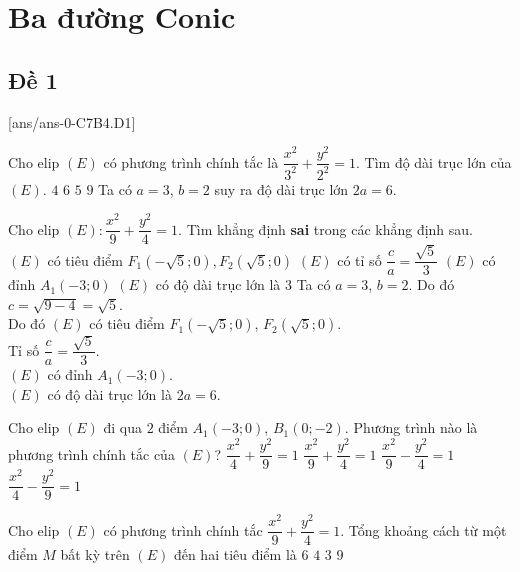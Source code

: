 \section{Ba đường Conic}

\subsection{Đề 1}
[ans/ans-0-C7B4.D1]
\caulc
\begin{ex}%
	Cho elip $(E)$ có phương trình chính tắc là $\dfrac{x^2}{3^2}+\dfrac{y^2}{2^2}=1$. Tìm độ dài trục lớn của $(E)$.
	\choice
	{$ 4 $}
	{\True $ 6 $}
	{$ 5 $}
	{$ 9 $}	
	\loigiai
	{
		Ta có $ a=3 $, $ b=2 $ suy ra độ dài trục lớn $ 2a=6 $.
	}
\end{ex}

\begin{ex}%
	Cho elip $(E)\colon  \dfrac{x^2}{9}+\dfrac{y^2}{4}=1$. Tìm khẳng định \textbf{sai} trong các khẳng định sau.
	\choice
	{$(E)$ có tiêu điểm $F_1(-\sqrt{5} ; 0), F_2(\sqrt{5} ; 0)$}
	{$(E)$ có tỉ số $\dfrac{c}{a}=\dfrac{\sqrt{5}}{3}$}
	{$(E)$ có đỉnh $A_1(-3 ; 0)$}
	{\True $(E)$ có độ dài trục lớn là $ 3 $}
	\loigiai
	{
		Ta có $ a=3 $, $ b=2 $. Do đó $ c=\sqrt{9-4}=\sqrt{5} $.\\
		Do đó $(E)$ có tiêu điểm $F_1(-\sqrt{5} ; 0)$, $F_2(\sqrt{5} ; 0)$.\\
		Tỉ số $ \dfrac{c}{a}=\dfrac{\sqrt{5}}{3} $.\\
		$(E)$ có đỉnh $A_1(-3 ; 0)$.\\
		$(E)$ có độ dài trục lớn là $ 2a=6 $.
	}
\end{ex}

\begin{ex}%
	Cho elip $(E)$ đi qua $2$ điểm $A_1(-3;0)$, $B_1(0;-2)$. Phương trình nào là phương trình chính tắc của $(E)$?
	\choice
	{$\dfrac{x^2}{4}+\dfrac{y^2}{9}=1$}
	{\True $\dfrac{x^2}{9}+\dfrac{y^2}{4}=1$}
	{$\dfrac{x^2}{9}-\dfrac{y^2}{4}=1$}
	{$\dfrac{x^2}{4}-\dfrac{y^2}{9}=1$}
\end{ex}


\begin{ex}%
	Cho elip $(E)$ có phương trình chính tắc $\dfrac{x^2}{9}+\dfrac{y^2}{4}=1$. Tổng khoảng cách từ một điểm $M$ bất kỳ trên $(E)$ đến hai tiêu điểm là 
	\choice
	{\True $6$}
	{$4$}
	{$3$}
	{$9$}
\end{ex}


